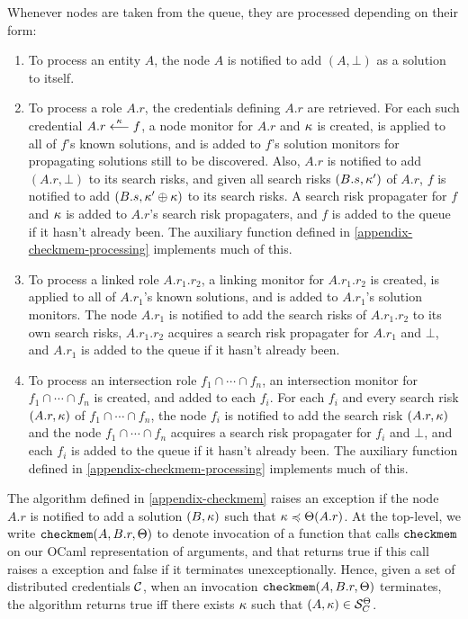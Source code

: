 Whenever nodes are taken from the queue, they are processed depending
on their form:
\begin{enumerate}
  \item To process an entity $A$, the node $A$ is notified to 
add $(A,\bot)$ as a solution to itself.
  \item To process a role $A.r$, the credentials defining $A.r$ are
retrieved.  For each such credential $A.r \stackrel{\kappa}{\longleftarrow} f$, a node
monitor for $A.r$ and $\kappa$ is created, is applied to all of $f$'s
known solutions, and is added to $f$'s solution monitors for
propagating solutions still to be discovered.  Also, $A.r$ is notified
to add $(A.r,\bot)$ to its search risks, and given all search risks
$(B.s,\kappa')$ of $A.r$, $f$ is notified to add $(B.s, \kappa'
\oplus \kappa)$ to its search risks.  A search risk propagater for
$f$ and $\kappa$ is added to $A.r$'s search risk propagaters, and $f$
is added to the queue if it hasn't already been.  The auxiliary function
 defined in \autoref{appendix-checkmem-processing}
implements much of this.
  \item To process a linked role $A.r_1.r_2$, a linking monitor for
$A.r_1.r_2$ is created, is applied to all of $A.r_1$'s known
solutions, and is added to $A.r_1$'s solution monitors.  The node
$A.r_1$ is notified to add the search risks of $A.r_1.r_2$ to its
own search risks, $A.r_1.r_2$ acquires a search risk propagater for
$A.r_1$ and $\bot$, and $A.r_1$ is added to the queue if it hasn't
already been.
  \item To process an intersection role $f_1 \cap \cdots \cap f_n$, an
intersection monitor for $f_1 \cap \cdots \cap f_n$ is created, and
added to each $f_i$.  For each $f_i$ and every search risk
$(A.r,\kappa)$ of $f_1 \cap \cdots \cap f_n$, the node $f_i$ is
notified to add the search risk $(A.r, \kappa)$ and the node $f_1 \cap
\cdots \cap f_n$ acquires a search risk propagater for $f_i$ and
$\bot$, and each $f_i$ is added to the queue if it hasn't already
been.  The auxiliary function  defined in
\autoref{appendix-checkmem-processing} implements much of this.
\end{enumerate}
The algorithm  defined in \autoref{appendix-checkmem}
raises an exception  if the node $A.r$ is notified to add
a solution $(B,\kappa)$ such that $\kappa \preccurlyeq \Theta(A.r)$.  At the
top-level, we write $\texttt{checkmem}(A,B.r,\Theta)$ to denote invocation of
a function that calls $\texttt{checkmem}$ on our OCaml representation of
arguments, and that returns true if this call raises a 
exception and false if it terminates unexceptionally.  Hence, given a
set of distributed credentials $\mathcal{C}$, when an invocation
$\texttt{checkmem}(A,B.r,\Theta)$ terminates, the algorithm returns true iff
there exists $\kappa$ such that $(A,\kappa) \in \mathcal{S}_{C}^\Theta$.

